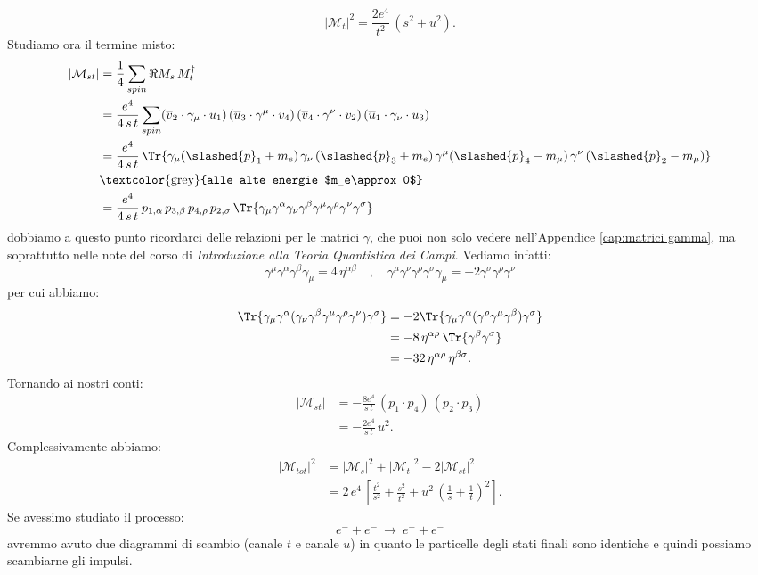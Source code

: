 \begin{equation}
    |\mathcal{M}_t|^2 = \frac{2e^4}{t^2}\, (s^2 + u^2).
\end{equation}
Studiamo ora il termine misto:
\begin{align}
    |\mathcal{M}_{st}| &= \frac{1}{4}\sum_{spin}\Re{M_s\, M_t^\dagger} \\
    &= \frac{e^4}{4\, s\, t}\sum_{spin} (\overline{v}_2\cdot\gamma_\mu\cdot u_1)\, (\overline{u}_3\cdot\gamma^\mu\cdot v_4)\, (\overline{v}_4\cdot\gamma^\nu\cdot v_2)\, (\overline{u}_1\cdot\gamma_\nu\cdot u_3) \\
    &= \frac{e^4}{4\, s\, t}\, \Tr{ \gamma_\mu(\slashed{p}_1 + m_e)\, \gamma_\nu\, (\slashed{p}_3 + m_e)\, \gamma^\mu(\slashed{p}_4 - m_\mu)\, \gamma^\nu\, (\slashed{p}_2 - m_\mu) } \\
    &\text{\textcolor{grey}{alle alte energie $m_e\approx 0$}} \notag \\
    &= \frac{e^4}{4\, s\, t}\, p_{1,\alpha}\, p_{3,\beta}\, p_{4,\rho}\, p_{2,\sigma}\, \Tr{\gamma_\mu\gamma^\alpha\gamma_\nu\gamma^\beta\gamma^\mu\gamma^\rho\gamma^\nu\gamma^\sigma}
\end{align}
dobbiamo a questo punto ricordarci delle relazioni per le matrici $\gamma$, che puoi non solo vedere nell'Appendice \ref{cap:matrici gamma}, ma soprattutto nelle note del corso di \textit{Introduzione alla Teoria Quantistica dei Campi}. Vediamo infatti:
\begin{equation}
    \gamma^\mu\gamma^\alpha\gamma^\beta\gamma_\mu = 4\, \eta^{\alpha\beta} \quad , \quad \gamma^\mu\gamma^\nu\gamma^\rho\gamma^\sigma\gamma_\mu = -2\gamma^\sigma\gamma^\rho\gamma^\nu
\end{equation}
per cui abbiamo:
\begin{align}
    \Tr{ \gamma_\mu\gamma^\alpha(\gamma_\nu\gamma^\beta\gamma^\mu\gamma^\rho\gamma^\nu)\gamma^\sigma } &= -2\Tr{ \gamma_\mu\gamma^\alpha(\gamma^\rho\gamma^\mu\gamma^\beta)\gamma^\sigma } \\
    &= -8\, \eta^{\alpha\rho}\, \Tr{\gamma^\beta\gamma^\sigma} \\
    &= -32\, \eta^{\alpha\rho}\, \eta^{\beta\sigma}.
\end{align}
Tornando ai nostri conti:
\begin{align}
    |\mathcal{M}_{st}| &= -\frac{8e^4}{s\, t}\, (p_1\cdot p_4)\, (p_2\cdot p_3) \\
    &= -\frac{2e^4}{s\, t}\, u^2.
\end{align}
Complessivamente abbiamo:
\begin{align}
    |\mathcal{M}_{tot}|^2 &= |\mathcal{M}_{s}|^2 + |\mathcal{M}_{t}|^2 - 2|\mathcal{M}_{st}|^2 \\
    &= 2\, e^4\, \left[\frac{t^2}{s^2} + \frac{s^2}{t^2} + u^2\, \left(\frac{1}{s} + \frac{1}{t}\right)^2 \right].
\end{align}
Se avessimo studiato il processo:
\begin{equation*}
    e^- + e^- \ \longrightarrow \ e^- + e^-
\end{equation*}
avremmo avuto due diagrammi di scambio (canale $t$ e canale $u$) in quanto le particelle degli stati finali sono identiche e quindi possiamo scambiarne gli impulsi.


